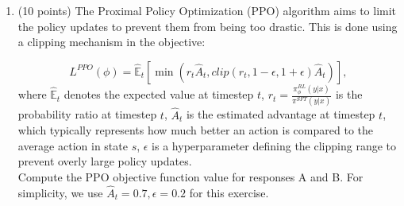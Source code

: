\begin{enumerate}
\item (10 points)
The Proximal Policy Optimization (PPO) algorithm aims to limit the policy updates to prevent them from being too drastic. This is done using a clipping mechanism in the objective:

\begin{equation}
    L^{PPO}(\phi) = \hat{\mathbb{E}}_t [\min (r_{t}\hat{A}_t,   clip(r_{t}, 1-\epsilon, 1+\epsilon)\hat{A}_t)],
\end{equation}
where $\hat{\mathbb{E}}_t$ denotes the expected value at timestep $t$, $r_t = \frac{\pi^{RL}_\phi(y|x)}{\pi^{SFT}(y|x)} $ is the probability ratio at timestep $t$, $\hat{A}_t$ is the estimated advantage at timestep $t$, which typically represents how much better an action is compared to the average action in state $s$, $\epsilon$ is a hyperparameter defining the clipping range to prevent overly large policy updates.\\

Compute the PPO objective function value for responses A and B. For simplicity, we use $\hat{A}_t = 0.7, \epsilon=0.2$ for this exercise.\\
\clearpage



\end{enumerate}
